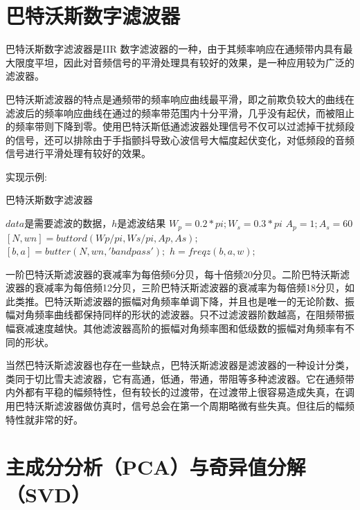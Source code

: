 \section{巴特沃斯数字滤波器}
{巴特沃斯数字滤波器是IIR 数字滤波器的一种，由于其频率响应在通频带内具有最大限度平坦，因此对音频信号的平滑处理具有较好的效果，是一种应用较为广泛的滤波器\cite{2012zhang}。}
\par
{巴特沃斯滤波器的特点是通频带的频率响应曲线最平滑\cite{2006wang}，即之前欺负较大的曲线在滤波后的频率响应曲线在通过的频率带范围内十分平滑，几乎没有起伏，而被阻止的频率带则下降到零。使用巴特沃斯低通滤波器处理信号不仅可以过滤掉干扰频段的信号，还可以排除由于手指颤抖导致心波信号大幅度起伏变化，对低频段的音频信号进行平滑处理有较好的效果\cite{2012zhang}。}
\par
{实现示例:}
\begin{algorithm}
        \caption{巴特沃斯数字滤波器}
        \begin{algorithmic}[1] %
        \Require $data$是需要滤波的数据，$h$是滤波结果
            \State $W_p=0.2*pi;W_s=0.3*pi$ \hspace{7em}{\#设置通带上限频率和下限频率}
            \State $A_p=1;A_s=60$\hspace{12em}
            \State $[N,wn]= buttord(Wp/pi,Ws/pi,Ap,As);$\hspace{1em}{\#生成阶数和归一化截至频率}
            \State $[b,a]= butter(N,wn,'bandpass');$\hspace{4em}\space\space{}
            \State$ h = freqz(b,a,w);$
            
        \end{algorithmic}
    \end{algorithm}
\par
{一阶巴特沃斯滤波器的衰减率为每倍频6分贝，每十倍频20分贝。二阶巴特沃斯滤波器的衰减率为每倍频12分贝，三阶巴特沃斯滤波器的衰减率为每倍频18分贝，如此类推。巴特沃斯滤波器的振幅对角频率单调下降，并且也是唯一的无论阶数、振幅对角频率曲线都保持同样的形状的滤波器。只不过滤波器阶数越高，在阻频带振幅衰减速度越快。其他滤波器高阶的振幅对角频率图和低级数的振幅对角频率有不同的形状。}
\par
{当然巴特沃斯滤波器也存在一些缺点，巴特沃斯滤波器是滤波器的一种设计分类，类同于切比雪夫滤波器，它有高通，低通，带通，带阻等多种滤波器。它在通频带内外都有平稳的幅频特性，但有较长的过渡带，在过渡带上很容易造成失真，在调用巴特沃斯滤波器做仿真时，信号总会在第一个周期略微有些失真。但往后的幅频特性就非常的好。}
\section{主成分分析（PCA）与奇异值分解（SVD）}
